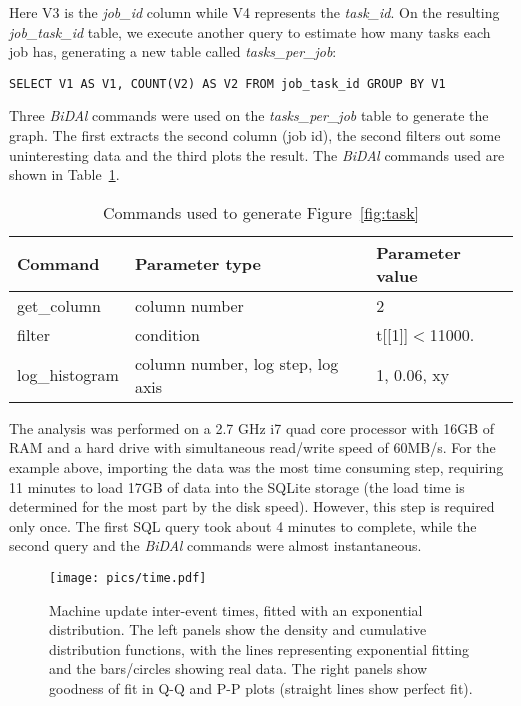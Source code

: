 \documentclass{article}
\begin{document}
Here V3 is the \emph{job\_id} column while V4 represents the \emph{task\_id}. On the resulting \emph{job\_task\_id} table, we execute another query to estimate how many tasks each job has, generating a new table called \emph{tasks\_per\_job}:

{\footnotesize\begin{verbatim}SELECT V1 AS V1, COUNT(V2) AS V2 FROM job_task_id GROUP BY V1\end{verbatim}}

Three \emph{BiDAl} commands were used on the  \emph{tasks\_per\_job} table to generate the graph. The first extracts the second column (job id), the second filters out some uninteresting data and the third plots the result. The \emph{BiDAl} commands used are shown in Table~\ref{tab:comm1}.


\begin{table}[h]
\begin{tabular}{|p{2cm}| p{5cm} |p{3cm}|}
\hline Command & Parameter type &Parameter value   \\
\hline\hline
get\_column& column number&2\\ \hline
filter&condition& t[[1]]$<$11000.\\ \hline
log\_histogram&column number, log step, log axis& 1, 0.06, xy\\ 
\hline
\end{tabular}
\caption{Commands used to generate Figure~\ref{fig:task}}
\label{tab:comm1}     
\end{table}


The analysis was performed on a 2.7 GHz i7 quad core processor with 16GB of RAM and a hard drive with simultaneous read/write speed of 60MB/s. For the example above, importing the data was the most time consuming step, requiring 11 minutes to load 17GB of data into the SQLite storage (the load time is determined for the most part by the disk speed). However, this step is required only once. The first SQL query took about 4 minutes to complete, while the second query and the \emph{BiDAl} commands were almost instantaneous.


\begin{figure}
\centering
  \texttt{[image: pics/time.pdf]}
\caption{Machine update inter-event times, fitted with  an exponential distribution. The left panels show the density and cumulative distribution functions, with the lines representing exponential fitting and the bars/circles showing real data. The right panels show goodness of fit in Q-Q and P-P plots (straight lines show perfect fit).}
\label{fig:time}       
\end{figure}
\end{document}
